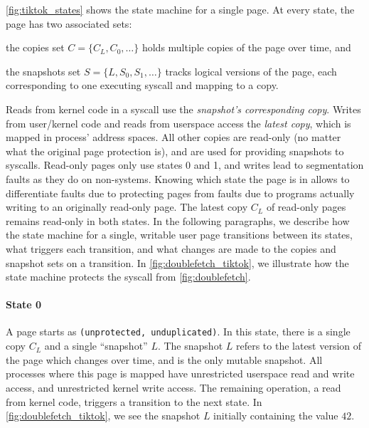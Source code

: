 \documentclass[letterpaper,twocolumn,10pt, anonymous]{article}
\begin{document}
\autoref{fig:tiktok_states} shows the state machine for a single page.
At every state, the page has two associated sets:
\begin{inparaenum}
  \item the copies set $C = \{C_L, C_0, \dots\}$ holds multiple copies of the page over time, and
  \item the snapshots set $S = \{L, S_0, S_1, \dots\}$ tracks logical versions of the page, each corresponding to one executing syscall and mapping to a copy. 
\end{inparaenum}
Reads from kernel code in a syscall use the \emph{snapshot's corresponding copy}.
Writes from user/kernel code and reads from userspace access the \emph{latest 
copy}, which is mapped in process' address spaces.
All other copies are read-only (no matter what the original page protection is), and are used for providing snapshots to syscalls.
Read-only pages only use states 0 and 1, and writes lead to segmentation faults
as they do on non-\tiktok systems.
Knowing which state the page is in allows \tiktok to differentiate faults due
to protecting pages from faults due to programs actually writing to an 
originally read-only page.
The latest copy $C_L$ of read-only pages remains read-only in both states.
In the following paragraphs, we describe how the state machine for a single, 
writable user page transitions between its states, what triggers each transition, 
and what changes are made to the copies and snapshot sets on a transition.
In \autoref{fig:doublefetch_tiktok}, we illustrate how the state machine protects the 
syscall from \autoref{fig:doublefetch}.

\paragraph{State 0}
A page starts as \texttt{(unprotected, unduplicated)}.
In this state, there is a single copy $C_L$ and a single ``snapshot'' $L$. 
The snapshot $L$ refers to the latest version of the page which changes 
over time, and is the only mutable snapshot.
All processes where this page is mapped have unrestricted userspace read and write 
access, and unrestricted kernel write access.
The remaining operation, a read from kernel code, triggers a transition to 
the next state.
In \autoref{fig:doublefetch_tiktok}, we see the snapshot $L$ initially containing 
the value $42$.
\end{document}
